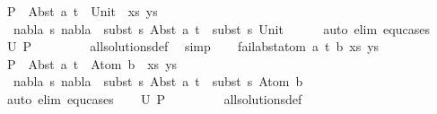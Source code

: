 \begin{isabellebody}
\ {\isacharquery}{\kern0pt}P\ {\isacharequal}{\kern0pt}\ {\isachardoublequoteopen}{\isacharparenleft}{\kern0pt}Abst\ a\ t\ {\isasymapprox}{\isacharquery}{\kern0pt}\ Unit\ {\isacharhash}{\kern0pt}\ xs{\isacharcomma}{\kern0pt}\ ys{\isacharparenright}{\kern0pt}{\isachardoublequoteclose}\isanewline
\ \ \isamarkupfalse%
\ {\isachardoublequoteopen}{\isasymnexists}\ nabla\ s{\isachardot}{\kern0pt}\ nabla\ {\isasymturnstile}\ subst\ s\ {\isacharparenleft}{\kern0pt}Abst\ a\ t{\isacharparenright}{\kern0pt}\ {\isasymapprox}\ subst\ s\ Unit{\isachardoublequoteclose}\isanewline
\ \ \ \ \isamarkupfalse%
\ {\isacharparenleft}{\kern0pt}auto\ elim{\isacharcolon}{\kern0pt}\ equ{\isachardot}{\kern0pt}cases{\isacharparenright}{\kern0pt}\isanewline
\ \ \isamarkupfalse%
\ {\isachardoublequoteopen}U\ {\isacharquery}{\kern0pt}P\ {\isacharequal}{\kern0pt}\ {\isacharbraceleft}{\kern0pt}{\isacharbraceright}{\kern0pt}{\isachardoublequoteclose}\ \isanewline
\ \ \ \ \isamarkupfalse%
\ all{\isacharunderscore}{\kern0pt}solutions{\isacharunderscore}{\kern0pt}def\ \isamarkupfalse%
\ simp\isanewline
{}\isamarkupfalse%
\isanewline
\ \ \isamarkupfalse%
\ {\isacharparenleft}{\kern0pt}fail{\isacharunderscore}{\kern0pt}abst{\isacharunderscore}{\kern0pt}atom\ a\ t\ b\ xs\ ys{\isacharparenright}{\kern0pt}\isanewline
\ \ \isamarkupfalse%
\ {\isacharquery}{\kern0pt}P\ {\isacharequal}{\kern0pt}\ {\isachardoublequoteopen}{\isacharparenleft}{\kern0pt}Abst\ a\ t\ {\isasymapprox}{\isacharquery}{\kern0pt}\ Atom\ b\ {\isacharhash}{\kern0pt}\ xs{\isacharcomma}{\kern0pt}\ ys{\isacharparenright}{\kern0pt}{\isachardoublequoteclose}\isanewline
\ \ \isamarkupfalse%
\ {\isachardoublequoteopen}{\isasymnexists}\ nabla\ s{\isachardot}{\kern0pt}\ nabla\ {\isasymturnstile}\ subst\ s\ {\isacharparenleft}{\kern0pt}Abst\ a\ t{\isacharparenright}{\kern0pt}\ {\isasymapprox}\ subst\ s\ {\isacharparenleft}{\kern0pt}Atom\ b{\isacharparenright}{\kern0pt}{\isachardoublequoteclose}\isanewline
\ \ \ \ \ \isamarkupfalse%
\ {\isacharparenleft}{\kern0pt}auto\ elim{\isacharcolon}{\kern0pt}\ equ{\isachardot}{\kern0pt}cases{\isacharparenright}{\kern0pt}\isanewline
\ \ \isamarkupfalse%
\ {\isachardoublequoteopen}U\ {\isacharquery}{\kern0pt}P\ {\isacharequal}{\kern0pt}\ {\isacharbraceleft}{\kern0pt}{\isacharbraceright}{\kern0pt}{\isachardoublequoteclose}\ \isanewline
\ \ \ \ \isamarkupfalse%
\ all{\isacharunderscore}{\kern0pt}solutions{\isacharunderscore}{\kern0pt}def\ \isamarkupfalse%

\end{isabellebody}
